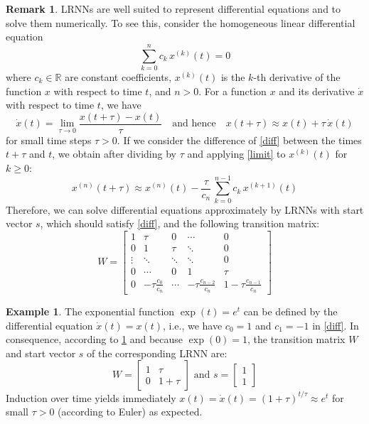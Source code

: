 \documentclass[twoside,11pt]{article}
\theoremstyle{definition}
\newtheorem{exmp}{Example}
\newtheorem{remk}{Remark}
\begin{document}
\begin{remk}\label{rem}
LRNNs are well suited to represent differential equations and to solve them
numerically. To see this, consider the homogeneous linear differential equation
\begin{equation}
	\sum_{k=0}^n c_k\,x^{(k)}(t) = 0 \label{diff}
\end{equation}
where $c_k \in \mathbb{R}$ are constant coefficients, $x^{(k)}(t)$ is the $k$-th
derivative of the function $x$ with respect to time $t$, and $n>0$. For a
function $x$ and its derivative $\dot{x}$ with respect to time $t$, we have
\begin{equation}
  \dot{x}(t) = \lim\limits_{\tau \to 0} \frac{x(t+\tau)-x(t)}{\tau}
	\quad\text{and hence}\quad
  x(t+\tau) \approx x(t) + \tau\,\dot{x}(t) \label{limit}
\end{equation}
for small time steps $\tau>0$. If we consider the difference of \cref{diff}
between the times $t+\tau$ and $t$, we obtain after dividing by $\tau$ and
applying \cref{limit} to $x^{(k)}(t)$ for $k \ge 0$:
\[
	x^{(n)}(t+\tau)
	\approx x^{(n)}(t) - \frac{\tau}{c_n}\,\sum_{k=0}^{n-1} c_k\,x^{(k+1)}(t)
\]
Therefore, we can solve differential equations approximately by LRNNs with
start vector $s$, which should satisfy \cref{diff}, and the following transition
matrix:
\[ W = \left[ \begin{array}{*{5}{c}}
	1 & \tau & 0 & \cdots & 0\\
	0 & 1 & \tau & \ddots & 0\\
	\vdots & \ddots & \ddots & \ddots & 0\\
	0 & \cdots & 0 & 1 & \tau\\
	0 & -\tau \frac{c_0}{c_n} & \cdots & -\tau \frac{c_{n-2}}{c_n} & 1\!-\!\tau \frac{c_{n-1}}{c_n}
\end{array} \right] \]
\end{remk}

\begin{exmp}\label{exp}
The exponential function $\exp(t) = e^t$ can be defined by the differential
equation $\dot{x}(t) = x(t)$, i.e., we have $c_0 = 1$ and $c_1 = -1$ in
\cref{diff}. In consequence, according to \cref{rem} and because $\exp(0)=1$,
the transition matrix $W$ and start vector $s$ of the corresponding LRNN are:
\[ W = \left[ \begin{array}{cc}
	1 & \tau\\
	0 & 1\!+\!\tau
   \end{array} \right]
   \text{~and~} s = \left[ \begin{array}{c}
	1\\
	1
   \end{array} \right]
\]
Induction over time yields immediately $x(t) = \dot{x}(t) = (1+\tau)^{t/\tau}
\approx e^t$ for small $\tau>0$ (according to Euler) as expected.
\end{exmp}
\end{document}
